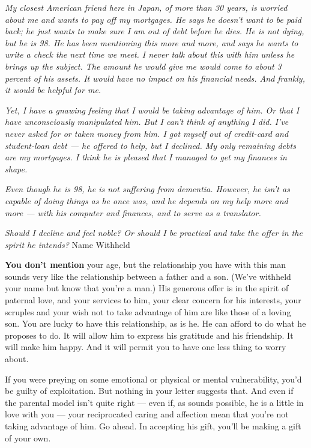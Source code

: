 \emph{My closest American friend here in Japan, of more than 30 years,
is worried about me and wants to pay off my mortgages. He says he
doesn't want to be paid back; he just wants to make sure I am out of
debt before he dies. He is not dying, but he is 98. He has been
mentioning this more and more, and says he wants to write a check the
next time we meet. I never talk about this with him unless he brings up
the subject. The amount he would give me would come to about 3 percent
of his assets. It would have no impact on his financial needs. And
frankly, it would be helpful for me.}

\emph{Yet, I have a gnawing feeling that I would be taking advantage of
him. Or that I have unconsciously manipulated him. But I can't think of
anything I did. I've never asked for or taken money from him. I got
myself out of credit-card and student-loan debt --- he offered to help,
but I declined. My only remaining debts are my mortgages. I think he is
pleased that I managed to get my finances in shape.}

\emph{Even though he is 98, he is not suffering from dementia. However,
he isn't as capable of doing things as he once was, and he depends on my
help more and more --- with his computer and finances, and to serve as a
translator.}

\emph{Should I decline and feel noble? Or should I be practical and take
the offer in the spirit he intends?} Name Withheld

\textbf{You don't mention} your age, but the relationship you have with
this man sounds very like the relationship between a father and a son.
(We've withheld your name but know that you're a man.) His generous
offer is in the spirit of paternal love, and your services to him, your
clear concern for his interests, your scruples and your wish not to take
advantage of him are like those of a loving son. You are lucky to have
this relationship, as is he. He can afford to do what he proposes to do.
It will allow him to express his gratitude and his friendship. It will
make him happy. And it will permit you to have one less thing to worry
about.

If you were preying on some emotional or physical or mental
vulnerability, you'd be guilty of exploitation. But nothing in your
letter suggests that. And even if the parental model isn't quite right
--- even if, as sounds possible, he is a little in love with you ---
your reciprocated caring and affection mean that you're not taking
advantage of him. Go ahead. In accepting his gift, you'll be making a
gift of your own.


